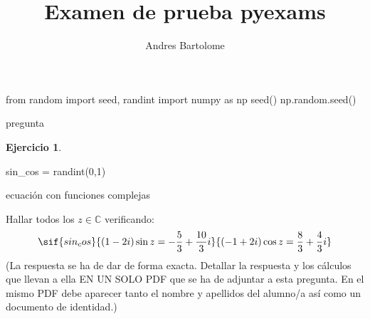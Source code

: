 ﻿\documentclass[11pt,a4paper]{article}
\title{Examen de prueba pyexams}
\author{Andres Bartolome}
\theoremstyle{definition}
\newtheorem*{ejercicio}{Ejercicio}
\begin{document}
\begin{runsilent}
from random import seed, randint
import numpy as np
seed(\seed)
np.random.seed(\seed)
\end{runsilent}


\begin{question}{pregunta}
\begin{ejercicio}

\begin{runsilent}
sin_cos = randint(0,1)
\end{runsilent}

    ecuación con funciones complejas \\
    \begin{tcolorbox}[colback=blue!10!white,colframe=blue!90!black,fonttitle=\bfseries,title=MOODLE]
        Hallar todos los $z \in \mathbb C$ verificando:
        \begin{equation*}
            \sif{sin_cos}{(1-2i)\sin{z}=-\frac{5}{3}+\frac{10}{3}i}{(-1+2i)\cos{z}=\frac{8}{3}+\frac{4}{3}i}
        \end{equation*}
        (La respuesta se ha de dar de forma exacta. Detallar la respuesta y los c\'alculos que llevan a ella EN UN SOLO PDF que se ha de adjuntar a esta pregunta. En el mismo PDF debe aparecer tanto el nombre y apellidos del alumno/a así como un documento de identidad.)
    \end{tcolorbox}
\end{ejercicio}

\bigskip





\end{question}
\end{document}
